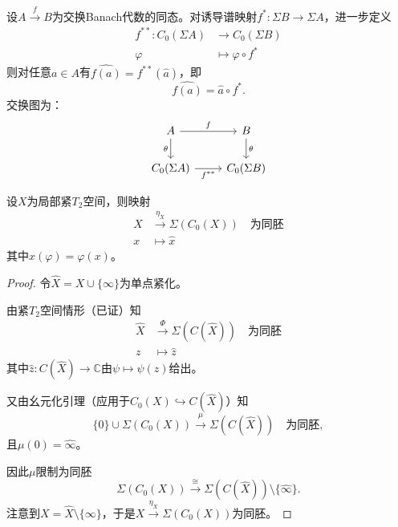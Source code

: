 \documentclass[lang=cn,a4paper,newtx,section]{elegantbook}
\begin{document}
\begin{remark}
  设$A \xrightarrow{f} B$为交换Banach代数的同态。对诱导谱映射$f^*: \Sigma B \to \Sigma A$，进一步定义
  \begin{equation*}
    \begin{aligned}
      f^{**}: C_0(\Sigma A) &\longrightarrow C_0(\Sigma B) \\
      \varphi &\longmapsto \varphi \circ f^*
    \end{aligned}
  \end{equation*}
  则对任意$a \in A$有$\widehat{f(a)} = f^{**}(\hat{a})$，即
  \begin{equation*}
    \widehat{f(a)} = \hat{a} \circ f^*.
  \end{equation*}
  交换图为：
  \begin{equation*}
    \begin{tikzcd}
      A \arrow[r, "f"] \arrow[d, "\theta"'] & B \arrow[d, "\theta"] \\
      C_0(\Sigma A) \arrow[r, "f^{**}"'] & C_0(\Sigma B)
    \end{tikzcd}
  \end{equation*}
\end{remark}

\begin{proposition}
  设$X$为局部紧$T_2$空间，则映射
  \begin{equation*}
    \begin{aligned}
      X & \xrightarrow{\eta_X} \Sigma(C_0(X)) \quad \text{为同胚} \\
      x & \longmapsto \hat{x}
    \end{aligned}
  \end{equation*}
  其中$\hat{x}(\varphi) = \varphi(x)$。
\end{proposition}

\begin{proof}
  令$\hat{X} = X \cup \{\infty\}$为单点紧化。
  
  由紧$T_2$空间情形（已证）知
  \begin{equation*}
    \begin{aligned}
      \hat{X} & \xrightarrow{\Phi} \Sigma(C(\hat{X})) \quad \text{为同胚} \\
      z & \longmapsto \hat{z}
    \end{aligned}
  \end{equation*}
  其中$\hat{z}: C(\hat{X}) \to \mathbb{C}$由$\psi \mapsto \psi(z)$给出。
  
  又由幺元化引理（应用于$C_0(X) \hookrightarrow C(\hat{X})$）知
  \begin{equation*}
    \{0\} \cup \Sigma(C_0(X)) \xrightarrow{\mu} \Sigma(C(\hat{X})) \quad \text{为同胚},
  \end{equation*}
  且$\mu(0) = \hat{\infty}$。
  
  因此$\mu$限制为同胚
  \begin{equation*}
    \Sigma(C_0(X)) \xrightarrow{\cong} \Sigma(C(\hat{X})) \setminus \{\hat{\infty}\}.
  \end{equation*}
  注意到$X = \hat{X} \setminus \{\infty\}$，于是$X \xrightarrow{\eta_X} \Sigma(C_0(X))$为同胚。
\end{proof}
\end{document}
